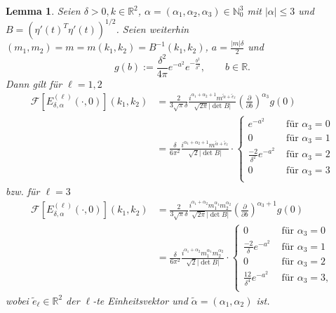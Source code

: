 \documentclass[12pt,a4paper]{scrartcl}
\newtheorem{Lemma}[Satz]{Lemma}
\numberwithin{equation}{section}
\newcommand{\R}{\mathbb{R}} %
\newcommand{\N}{\mathbb{N}} %
\newcommand{\F}{\mathcal{F}} %
\begin{document}
\begin{Lemma} \label{LFEdelta}
Seien $\delta>0, k \in \R^2$, $\alpha=(\alpha_1,\alpha_2,\alpha_3) \in \N_0^3$ mit $|\alpha| \leq 3$ und $B=(\eta'(t)^T \eta'(t))^{1/2}$. Seien weiterhin $(m_1,m_2)=m=m(k_1,k_2)=B^{-1}(k_1,k_2)$, $a=\frac{|m|\delta}{2}$ und
\[
g(b):=\frac{\delta^2}{4 \pi}e^{-a^2} e^{-\frac{b^2}{\delta^2}}, \qquad b \in \R.
\] 
Dann gilt für $\ell=1,2$
\begin{align*}
\F [E_{\delta,\alpha}^{(\ell)}(\cdot,0) ](k_1,k_2) 
&= \frac{2}{3\sqrt{\pi}\delta} \frac{
i^{\alpha_1 +\alpha_2+1} m^{\widetilde \alpha+ \widetilde e_\ell}}{
\sqrt{2\pi} |\det B|}
\left(\frac{\partial}{\partial b}\right)^{\alpha_3} g(0) \\
&=\frac{\delta}{6 \pi^{2}} \frac{
i^{\alpha_1 +\alpha_2+1} m^{\widetilde \alpha+ \widetilde e_\ell}}{
\sqrt{2} |\det B|}
\cdot
\begin{cases}
e^{-a^2} &\text{ für } \alpha_3=0 \\
0  &\text{ für } \alpha_3=1 \\
\frac{-2}{\delta^2}e^{-a^2} &\text{ für } \alpha_3=2 \\
0  &\text{ für } \alpha_3=3 \\
\end{cases}
\end{align*}
bzw. für $\ell=3$
\begin{align*}
\F [E_{\delta,\alpha}^{(\ell)}(\cdot,0) ](k_1,k_2) &= \frac{2}{3\sqrt{\pi}\delta} \frac{i^{\alpha_1 +\alpha_2} m_1^{\alpha_1}m_2^{\alpha_2}}{\sqrt{2\pi} |\det B|}\left(\frac{\partial}{\partial b}\right)^{\alpha_3+1} g(0) \\
&=\frac{\delta}{6 \pi^{2}} \frac{i^{\alpha_1 +\alpha_2} m_1^{\alpha_1}m_2^{\alpha_2}}{\sqrt{2} |\det B|} \cdot
\begin{cases}
0 &\text{ für } \alpha_3=0 \\
\frac{-2}{\delta}e^{-a^2}  &\text{ für } \alpha_3=1 \\
0 &\text{ für } \alpha_3=2 \\
\frac{12}{\delta^4}e^{-a^2}  &\text{ für } \alpha_3=3, \\
\end{cases}
\end{align*}
wobei $\tilde e_\ell \in \R^2$ der $\ell$-te Einheitsvektor und $\tilde \alpha = (\alpha_1,\alpha_2)$ ist.
\end{Lemma}
\end{document}
